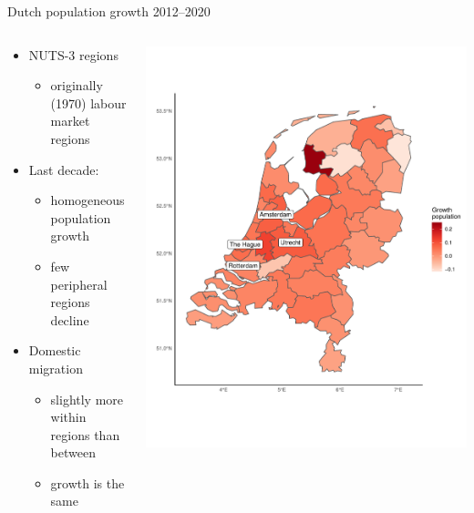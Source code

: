 \documentclass{beamer}
\begin{document}
\begin{frame}{Dutch population growth 2012--2020}
\begin{columns}
	\begin{column}{0.5\textwidth}
	\begin{itemize}
		\item NUTS-3 regions
		\begin{itemize}
			\item originally (1970) labour market regions \newline
		\end{itemize}
		\item Last decade:
		\begin{itemize}
			\item homogeneous population growth
			\item \alert{few} peripheral regions decline\newline
		\end{itemize}
		\item Domestic migration
			\begin{itemize}
				\item slightly more \alert{within} regions than \alert{between} 
				\item growth is the \alert{same}
			\end{itemize}
	\end{itemize}
	\end{column}
	\begin{column}{0.5\textwidth}
		\begin{center}
			\includegraphics[width=1\textwidth]{../../fig/growth_pop}
		\end{center}
	\end{column}
\end{columns}
\end{frame}
\end{document}
